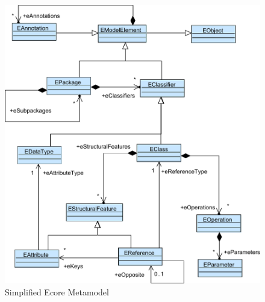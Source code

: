 \begin{figure}
\centering
\includegraphics[scale=0.9]{gfx/ex/Ecore} 
\caption{Simplified Ecore Metamodel}
\label{MM:Ecore}
\end{figure}
	
